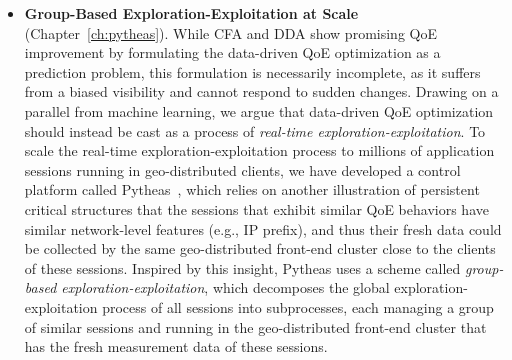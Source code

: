 \begin{itemize}
\item {\bf Group-Based Exploration-Exploitation at Scale} 
(Chapter~\ref{ch:pytheas}). 
While CFA and DDA show promising QoE improvement by formulating the 
data-driven QoE optimization as a prediction problem, this formulation is necessarily 
incomplete, as it suffers from a biased visibility and cannot respond to sudden changes.
Drawing on a parallel from machine learning, 
we argue that data-driven QoE optimization should instead be 
cast as a process of {\em real-time exploration-exploitation}. 
To scale the real-time exploration-exploitation process to millions of 
application 
sessions running in geo-distributed clients, we have developed 
a control platform called Pytheas~\cite{pytheas}, which 
relies on another illustration of persistent critical structures that 
the sessions that exhibit similar QoE behaviors have similar network-level 
features (e.g., IP prefix), and thus their fresh data could be collected 
by the same geo-distributed front-end cluster close to the clients of
these sessions. Inspired by this insight, Pytheas uses a scheme called 
{\em group-based exploration-exploitation},  which decomposes the 
global exploration-exploitation process of all sessions into 
subprocesses, each managing a group of similar sessions and running in
the geo-distributed front-end cluster that has the fresh measurement data 
of these sessions.



\end{itemize}
